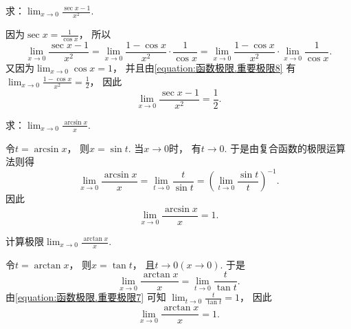 \begin{example}
求：\(\lim_{x\to0} \frac{\sec x-1}{x^2}\).
\begin{solution}
因为\(\sec x = \frac1{\cos x}\)，
所以\begin{equation*}
	\lim_{x\to0} \frac{\sec x-1}{x^2}
	= \lim_{x\to0} \frac{1-\cos x}{x^2} \cdot \frac1{\cos x}
	= \lim_{x\to0} \frac{1-\cos x}{x^2} \cdot \lim_{x\to0} \frac1{\cos x}.
\end{equation*}
又因为\(\lim_{x\to0} \cos x = 1\)，
并且由\cref{equation:函数极限.重要极限8} 有
\(\lim_{x\to0} \frac{1-\cos x}{x^2} = \frac12\)，
因此\begin{equation}\label{equation:函数极限.重要极限15}
	\lim_{x\to0} \frac{\sec x-1}{x^2} = \frac12.
\end{equation}
\end{solution}
\end{example}

\begin{example}
求：\(\lim_{x\to0} \frac{\arcsin x}{x}\).
\begin{solution}
令\(t = \arcsin x\)，
则\(x = \sin t\).
当\(x\to0\)时，
有\(t\to0\).
于是由复合函数的极限运算法则得\begin{equation*}
	\lim_{x\to0} \frac{\arcsin x}{x}
	= \lim_{t\to0} \frac{t}{\sin t}
	= \left(\lim_{t\to0} \frac{\sin t}{t}\right)^{-1}.
\end{equation*}
因此\begin{equation}\label{equation:函数极限.重要极限9}
	\lim_{x\to0} \frac{\arcsin x}{x} = 1.
\end{equation}
\end{solution}
\end{example}

\begin{example}
计算极限\(\lim_{x\to0} \frac{\arctan x}{x}\).
\begin{solution}
令\(t = \arctan x\)，
则\(x = \tan t\)，
且\(t\to0(x\to0)\).
于是\begin{equation*}
	\lim_{x\to0} \frac{\arctan x}{x}
	= \lim_{t\to0} \frac{t}{\tan t}.
\end{equation*}
由\cref{equation:函数极限.重要极限7} 可知
\(\lim_{t\to0} \frac{t}{\tan t} = 1\)，
因此\begin{equation}\label{equation:函数极限.重要极限10}
	\lim_{x\to0} \frac{\arctan x}{x} = 1.
\end{equation}
\end{solution}
\end{example}

